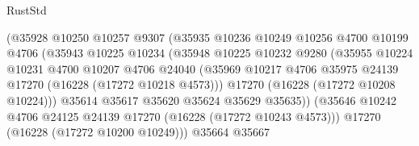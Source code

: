 \begin{lexlean}{RustStd}
\begin{coremodule}
                                    (@35928
                                      @10250
                                      @10257
                                      @9307
                                      (@35935
                                        @10236
                                        @10249
                                        @10256
                                        @4700
                                        @10199
                                        @4706
                                        (@35943
                                          @10225
                                          @10234
                                          (@35948
                                            @10225
                                            @10232
                                            @9280
                                            (@35955
                                              @10224
                                              @10231
                                              @4700
                                              @10207
                                              @4706
                                              @24040
                                              (@35969
                                                @10217
                                                @4706
                                                @35975
                                                @24139
                                                @17270
                                                (@16228 (@17272 @10218 @4573)))
                                              @17270
                                              (@16228 (@17272 @10208 @10224)))
                                            @35614
                                            @35617
                                            @35620
                                            @35624
                                            @35629
                                            @35635))
                                        (@35646
                                          @10242
                                          @4706
                                          @24125
                                          @24139
                                          @17270
                                          (@16228 (@17272 @10243 @4573)))
                                        @17270
                                        (@16228 (@17272 @10200 @10249)))
                                      @35664
                                      @35667

\end{coremodule}
\end{lexlean}
